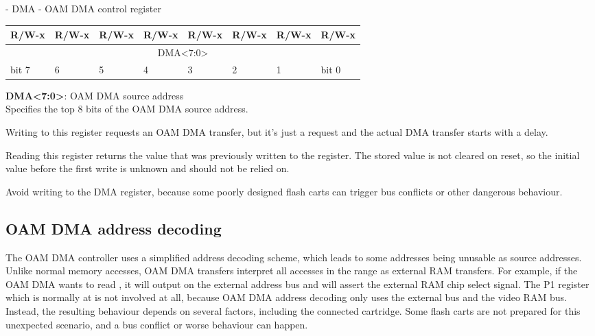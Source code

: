 \documentclass[\main/gbctr.tex]{subfiles}
\begin{document}
\begin{register}[H]
  \caption{ - DMA - OAM DMA control register}
  {
    \ttfamily
    \begin{tabularx}{\linewidth}{|X|X|X|X|X|X|X|X|}
      \hline
      R/W-x                           & R/W-x & R/W-x & R/W-x & R/W-x & R/W-x & R/W-x & R/W-x \\
      \hline
      \multicolumn{8}{|c|}{DMA<7:0>} \\
      \hline
      bit 7                           & 6     & 5     & 4     & 3     & 2     & 1     & bit 0 \\
      \hline
    \end{tabularx}{\parfillskip=0pt\par}
  }

  \begin{description}[leftmargin=5em, style=nextline]
    \item[bit 0]
      \textbf{DMA<7:0>}: OAM DMA source address\\
      Specifies the top 8 bits of the OAM DMA source address.

      Writing to this register requests an OAM DMA transfer, but it's just a
      request and the actual DMA transfer starts with a delay.

      Reading this register returns the value that was previously written to
      the register. The stored value is not cleared on reset, so the initial
      value before the first write is unknown and should not be relied on.
  \end{description}
\end{register}

\begin{warning}
  Avoid writing  to the DMA register, because some poorly
designed flash carts can trigger bus conflicts or other dangerous behaviour.
\end{warning}

\subsection{OAM DMA address decoding}

The OAM DMA controller uses a simplified address decoding scheme, which leads
to some addresses being unusable as source addresses. Unlike normal memory
accesses, OAM DMA transfers interpret all accesses in the 
range as external RAM transfers. For example, if the OAM DMA wants to read
, it will output  on the external address bus and will
assert the external RAM chip select signal. The P1 register which is normally
at  is not involved at all, because OAM DMA address decoding only
uses the external bus and the video RAM bus. Instead, the resulting behaviour
depends on several factors, including the connected cartridge. Some flash carts
are not prepared for this unexpected scenario, and a bus conflict or worse
behaviour can happen.
\end{document}
